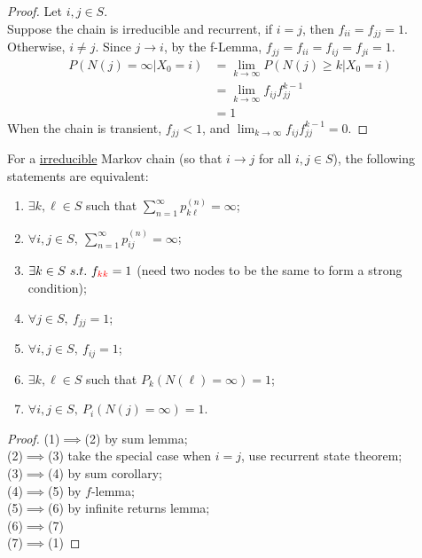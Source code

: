 \documentclass{article}
\newcommand{\upn}[0]{^{(n)}}
\begin{document}
    \begin{proof}
    	Let $i, j \in S$. \\
    	Suppose the chain is irreducible and recurrent, if $i = j$, then $f_{ii} = f_{jj} = 1$. \\
    	Otherwise, $i \neq j$. Since $j \to i$, by the f-Lemma, $f_{jj} = f_{ii} = f_{ij} = f_{ji} = 1$.
    	\begin{align}
    		P(N(j) = \infty | X_0 = i)
    		&= \lim_{k \to \infty} P(N(j) \geq k | X_0 = i) \\
    		&= \lim_{k \to \infty} f_{ij} f_{jj}^{k-1} \\
    		&= 1
    	\end{align}
    	When the chain is transient, $f_{jj} < 1$, and $\lim_{k \to \infty} f_{ij} f_{jj}^{k-1} = 0$.
    \end{proof}
    
    \begin{theorem}
    	For a \ul{irreducible} Markov chain (so that $i \to j$ for all $i, j \in S$), the following statements are equivalent:
    	\begin{enumerate}[(1)]
    		\item $\exists k, \ell \in S$ such that $\sum_{n=1}^\infty p_{k \ell}\upn = \infty$;
    		\item $\forall i,j \in S,\ \sum_{n=1}^\infty p_{ij}\upn = \infty$;
    		\item $\exists k \in S\ s.t.\ f_{\textcolor{red}{kk}} = 1$ (need two nodes to be the same to form a strong condition);
    		\item $\forall j \in S,\ f_{jj} = 1$;
    		\item $\forall i,j \in S,\ f_{ij} = 1$;
    		\item $\exists k, \ell \in S$ such that $P_k(N(\ell) = \infty) = 1$;
    		\item $\forall i, j \in S,\ P_i(N(j) = \infty) = 1$.
    	\end{enumerate}
    \end{theorem}

	\begin{proof}
		(1)$\implies$(2) by sum lemma; \\
		(2)$\implies$(3) take the special case when $i = j$, use recurrent state theorem; \\
		(3)$\implies$(4) by sum corollary; \\
		(4)$\implies$(5) by $f$-lemma; \\
		(5)$\implies$(6) by infinite returns lemma; \\
		(6)$\implies$(7)  \\
		(7)$\implies$(1)
	\end{proof}
\end{document}
